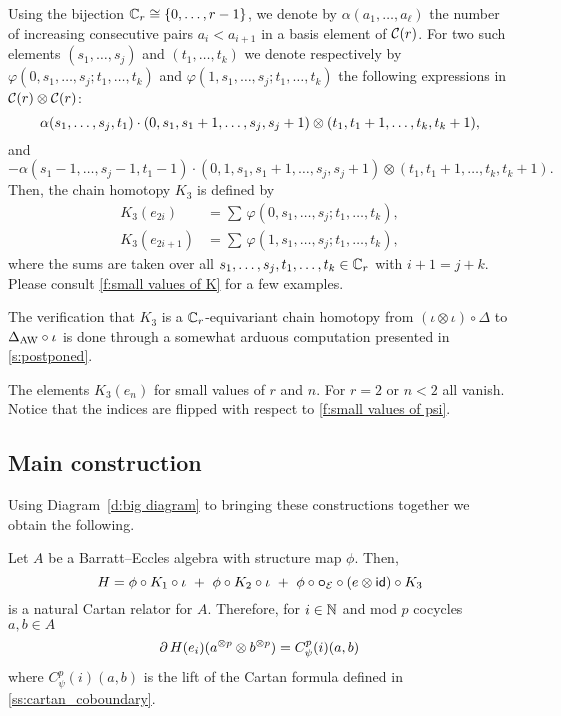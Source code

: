 Using the bijection $\mathbb{C}_r \cong \{0,\dots,r-1\}$, we denote by $\alpha(a_1,\dots,a_\ell)$ the number of increasing consecutive pairs $a_i < a_{i+1}$ in a basis element of $\mathcal{C}(r)$.
For two such elements $(s_1,\dots,s_j)$ and $(t_1,\dots,t_k)$ we denote respectively by $\varphi(0,s_1,\dots,s_j;t_1,\dots,t_k)$ and $\varphi(1,s_1,\dots,s_j;t_1,\dots,t_k)$ the following expressions in $\mathcal{C}(r) \otimes \mathcal{C}(r)$:
\[
\alpha(s_1,\dots,s_j,t_1) \cdot
(0,s_1,s_1+1,\dots,s_j,s_j+1) \otimes
(t_1,t_1+1,\dots,t_k,t_k+1),
\]
and
\[
- \alpha(s_1-1,\dots,s_j-1,t_1-1) \cdot
(0,1,s_1,s_1+1,\dots,s_j,s_j+1)\otimes (t_1,t_1+1,\dots,t_k,t_k+1).
\]
Then, the chain homotopy $K_3$ is defined by
\[
\begin{split}
	K_3(e_{2i})   &= \sum \, \varphi(0,s_1,\dots,s_j;t_1,\dots,t_k), \\
	K_3(e_{2i+1}) &= \sum \, \varphi(1,s_1,\dots,s_j;t_1,\dots,t_k),
\end{split}
\]
where the sums are taken over all $s_1,\dots,s_j,t_1,\dots,t_k \in \mathbb{C}_r$ with $i+1 = j+k$.
Please consult \cref{f:small values of K} for a few examples.

The verification that $K_3$ is a $\mathbb{C}_r$-equivariant chain homotopy from $(\iota\otimes \iota)\circ \Delta$ to $\Delta_{\operatorname{AW}}\circ \iota$ is done through a somewhat arduous computation presented in \cref{s:postponed}.

\begin{table}
	\centering
	
	\caption{The elements $K_3(e_n)$ for small values of $r$ and $n$. For $r=2$ or $n<2$ all vanish. Notice that the indices are flipped with respect to \cref{f:small values of psi}.}
	\label{f:small values of K}
\end{table}

\subsection{Main construction}

Using Diagram~\eqref{d:big diagram} to bringing these constructions together we obtain the following.

\begin{theorem*}
	Let $A$ be a Barratt--Eccles algebra with structure map $\phi$.
	Then,
	\[
	H = \phi \circ K_1 \circ \iota \ +\ \phi \circ K_2 \circ \iota \ +\ \phi \circ \bcirc_{\BE} \circ (e \ot \id)\circ K_3
	\]
	is a natural Cartan relator for $A$.
	Therefore, for $i \in \mathbb{N}$ and mod $p$ cocycles $a,b \in A$
	\[
	\operatorname{\partial} H(e_i)(a^{\otimes p} \otimes b^{\otimes p}) = C_\psi^p(i)(a, b)
	\]
	where $C_\psi^p(i)(a, b)$ is the lift of the Cartan formula defined in {\rm \cref{ss:cartan_coboundary}}.
\end{theorem*}